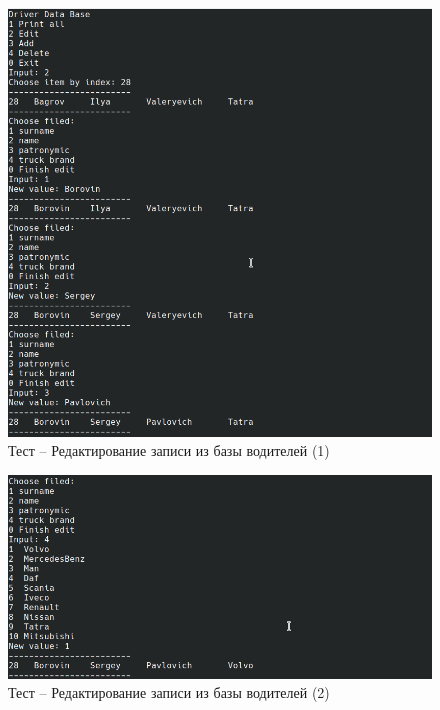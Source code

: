 \begin{figure}[H]
	\centering
	\includegraphics[width=0.8\linewidth]{photo/tests/admin/driver_db_edit_1}
	\caption{Тест -- Редактирование записи из базы водителей (1)}
	\label{driver_db_edit_1}
\end{figure}

\begin{figure}[H]
	\centering
	\includegraphics[width=0.8\linewidth]{photo/tests/admin/driver_db_edit_2}
	\caption{Тест -- Редактирование записи из базы водителей (2)}
	\label{driver_db_edit_2}
\end{figure}

